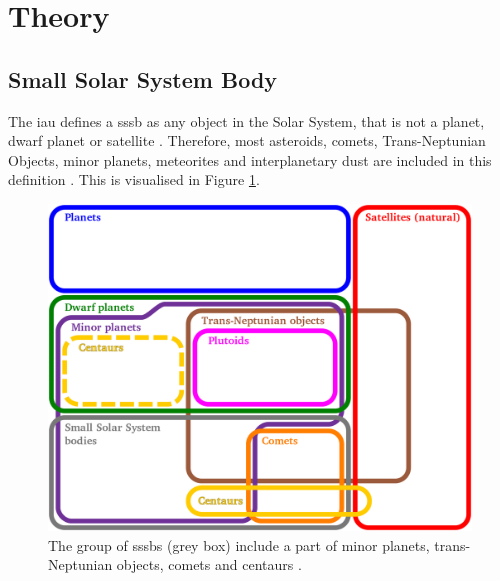 \section{Theory} \label{sec:theory}
%
%
%
%

\subsection{Small Solar System Body}
The \gls{iau} defines a \gls{sssb} as any object in the Solar System, that is not a planet, dwarf planet or satellite \cite{iau_sssb}. Therefore, most asteroids, comets, Trans-Neptunian Objects, minor planets, meteorites and interplanetary dust are included in this definition \cite{wiki:sssb}. This is visualised in Figure \ref{fig:sssb_diagram}.

\begin{figure}[htb]
    \centering
    \includegraphics[width=.7\textwidth]{doc/thesis/0_figures/Euler_diagram_of_solar_system_bodies.png}
    \caption{The group of \glspl{sssb} (grey box) include a part of minor planets, trans-Neptunian objects, comets and centaurs \cite{wiki:sssb}.}
    \label{fig:sssb_diagram}
\end{figure}

